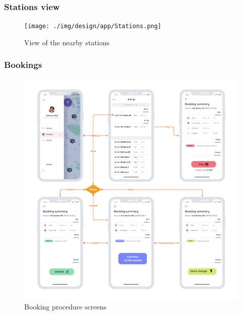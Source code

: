 \subsubsection{Stations view}
\begin{center}
    \begin{figure}[H]
        \texttt{[image: ./img/design/app/Stations.png]}
        \caption{View of the nearby stations}
    \end{figure}
\end{center}


\subsubsection{Bookings}
\begin{center}
    \begin{figure}[H]
        \includegraphics[width=\textwidth]{./img/design/app/Bookings.png}
        \caption{Booking procedure screens}
    \end{figure}
\end{center}

